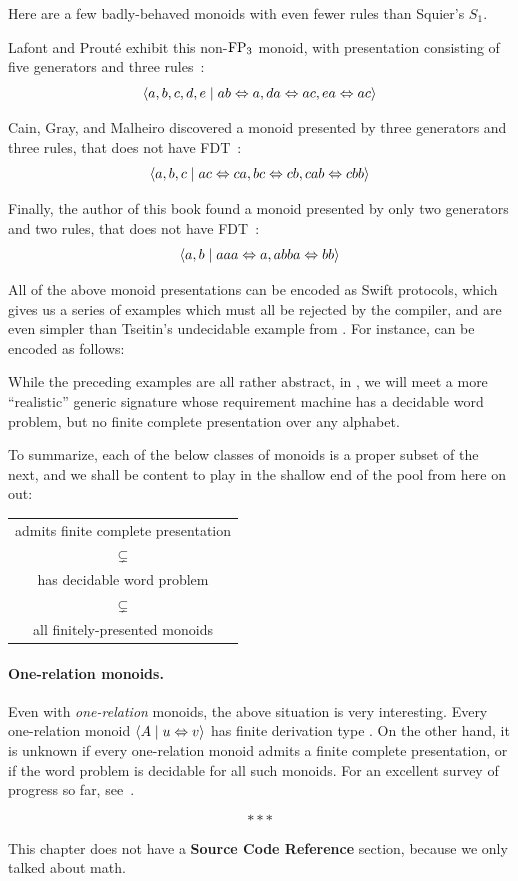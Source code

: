 \documentclass[../generics]{subfiles}
\begin{document}
Here are a few badly-behaved monoids with even fewer rules than Squier's $S_1$.

\begin{example}
Lafont and Prout{\'e} exhibit this non-$\mathrm{FP}_3$ monoid, with presentation consisting of five generators and three rules~\cite{Lafont1991ChurchRooserPA}:
\[
\langle a,b,c,d,e \mid ab \Leftrightarrow a, da \Leftrightarrow ac, ea \Leftrightarrow ac\rangle
\]
\end{example}

\begin{example}
Cain, Gray, and Malheiro discovered a monoid presented by three generators and three rules, that does not have FDT~\cite{CAIN201768}:
\[
\langle a,b,c \mid ac \Leftrightarrow ca, bc \Leftrightarrow cb, cab \Leftrightarrow cbb\rangle
\]
\end{example}

\begin{example}\label{ex:aaaaabbabb}
Finally, the author of this book found a monoid presented by only two generators and two rules, that does not have FDT~\cite{aaaaabbabb}:
\[
\langle a,b \mid aaa \Leftrightarrow a, abba \Leftrightarrow bb\rangle
\]
\end{example}

All of the above monoid presentations can be encoded as Swift protocols, which gives us a series of examples which must all be rejected by the compiler, and are even simpler than Tseitin's undecidable example from . For instance,  can be encoded as follows:

While the preceding examples are all rather abstract, in , we will meet a more ``realistic'' generic signature whose requirement machine has a decidable word problem, but no finite complete presentation over any alphabet.

To summarize, each of the below classes of monoids is a proper subset of the next, and we shall be content to play in the shallow end of the pool from here on out:
\begin{center}
\begin{tabular}{c}
admits finite complete presentation \\
$\subsetneq$ \\
has decidable word problem \\
$\subsetneq$ \\
all finitely-presented monoids
\end{tabular}
\end{center}

\paragraph{One-relation monoids.}
Even with \emph{one-relation} monoids, the above situation is very interesting. Every one-relation monoid $\langle A \mid u \Leftrightarrow v\rangle$ has finite derivation type \cite{KOBAYASHI2000547}. On the other hand, it is unknown if every one-relation monoid admits a finite complete presentation, or if the word problem is decidable for all such monoids. For an excellent survey of progress so far, see~\cite{onerelation}.
\begin{ceqn}
\[\ast \ast \ast\]
\end{ceqn}

This chapter does not have a \textbf{Source Code Reference} section, because we only talked about math.
\end{document}
